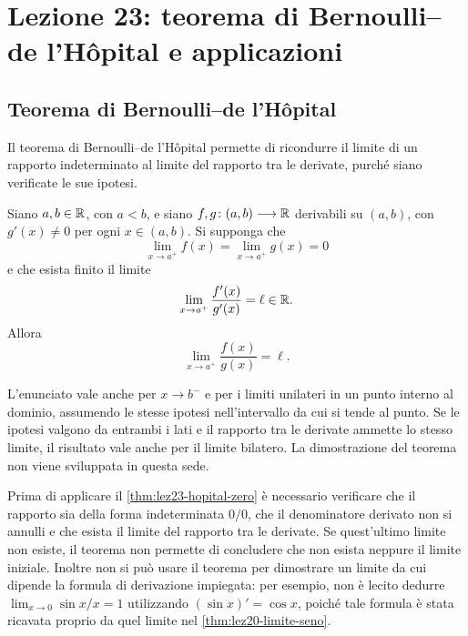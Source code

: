 \chapter[Lezione 23 --- 21 novembre 2026]{Lezione 23: teorema di Bernoulli--de l'Hôpital e applicazioni}
\label{chap:lezione-23}

\section{Teorema di Bernoulli--de l'Hôpital}
\label{sec:lez23-hopital}

Il teorema di Bernoulli--de l'Hôpital permette di ricondurre
il limite di un rapporto indeterminato al limite del rapporto
tra le derivate, purché siano verificate le sue ipotesi.

\begin{theorem}
\label{thm:lez23-hopital-zero}
Siano \(a,b\in\mathbb{R}\), con \(a<b\), e siano
\(f,g\colon(a,b)\longrightarrow\mathbb{R}\) derivabili su \((a,b)\),
con \(g'(x)\ne0\) per ogni \(x\in(a,b)\).
Si supponga che
\[
  \lim_{x\to a^+}f(x)=\lim_{x\to a^+}g(x)=0
\]
e che esista finito il limite
\[
  \lim_{x\to a^+}\frac{f'(x)}{g'(x)}=\ell\in\mathbb{R}.
\]
Allora
\[
  \lim_{x\to a^+}\frac{f(x)}{g(x)}=\ell.
\]
\end{theorem}

L'enunciato vale anche per \(x\to b^-\) e per i limiti
unilateri in un punto interno al dominio, assumendo
le stesse ipotesi nell'intervallo da cui si tende al punto.
Se le ipotesi valgono da entrambi i lati e il rapporto
tra le derivate ammette lo stesso limite, il risultato
vale anche per il limite bilatero.
La dimostrazione del teorema non viene sviluppata in questa sede.

\begin{remark}
\label{rem:lez23-hopital-condizioni}
Prima di applicare il \cref{thm:lez23-hopital-zero}
è necessario verificare che il rapporto sia della forma
indeterminata \(0/0\), che il denominatore derivato non
si annulli e che esista il limite del rapporto tra le derivate.
Se quest'ultimo limite non esiste, il teorema non permette
di concludere che non esista neppure il limite iniziale.
Inoltre non si può usare il teorema per dimostrare un limite
da cui dipende la formula di derivazione impiegata:
per esempio, non è lecito dedurre
\(\lim_{x\to0}\sin x/x=1\) utilizzando
\((\sin x)'=\cos x\), poiché tale formula è stata
ricavata proprio da quel limite nel
\cref{thm:lez20-limite-seno}.
\end{remark}

